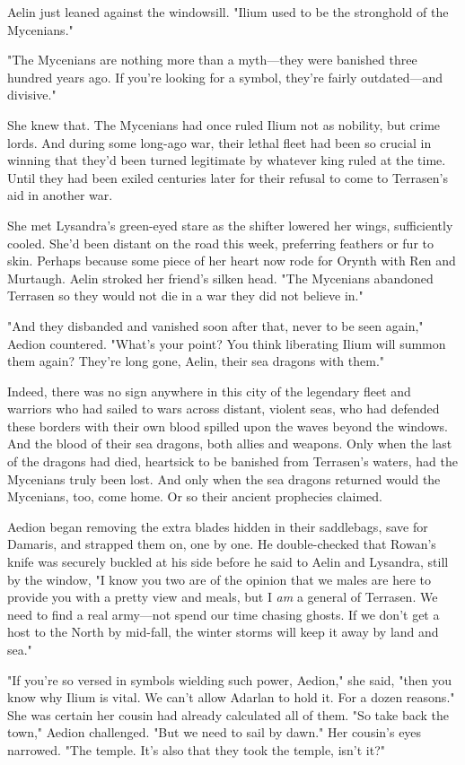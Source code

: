 Aelin just leaned against the windowsill.
"Ilium used to be the stronghold of the Mycenians."

"The Mycenians are nothing more than a myth---they were banished three hundred years ago.
If you're looking for a symbol, they're fairly outdated---and divisive."

She knew that.
The Mycenians had once ruled Ilium not as nobility, but crime lords.
And during some long-ago war, their lethal fleet had been so crucial in winning that they'd been turned legitimate by whatever king ruled at the time.
Until they had been exiled centuries later for their refusal to come to Terrasen's aid in another war.

She met Lysandra's green-eyed stare as the shifter lowered her wings, sufficiently cooled.
She'd been distant on the road this week, preferring feathers or fur to skin.
Perhaps because some piece of her heart now rode for Orynth with Ren and Murtaugh.
Aelin stroked her friend's silken head.
"The Mycenians abandoned Terrasen so they would not die in a war they did not believe in."

"And they disbanded and vanished soon after that, never to be seen again," Aedion countered.
"What's your point?
You think liberating Ilium will summon them again?
They're long gone, Aelin, their sea dragons with them."

Indeed, there was no sign anywhere in this city of the legendary fleet and warriors who had sailed to wars across distant, violent seas, who had defended these borders with their own blood spilled upon the waves beyond the windows.
And the blood of their sea dragons, both allies and weapons.
Only when the last of the dragons had died, heartsick to be banished from Terrasen's waters, had the Mycenians truly been lost.
And only when the sea dragons returned would the Mycenians, too, come home.
Or so their ancient prophecies claimed.

Aedion began removing the extra blades hidden in their saddlebags, save for Damaris, and strapped them on, one by one.
He double-checked that Rowan's knife was securely buckled at his side before he said to Aelin and Lysandra, still by the window, "I know you two are of the opinion that we males are here to provide you with a pretty view and meals, but I \emph{am} a general of Terrasen.
We need to find a real army---not spend our time chasing ghosts.
If we don't get a host to the North by mid-fall, the winter storms will keep it away by land and sea."

"If you're so versed in symbols wielding such power, Aedion," she said, "then you know why Ilium is vital.
We can't allow Adarlan to hold it.
For a dozen reasons."
She was certain her cousin had already calculated all of them.
"So take back the town," Aedion challenged.
"But we need to sail by dawn."
Her cousin's eyes narrowed.
"The temple.
It's also that they took the temple, isn't it?"

